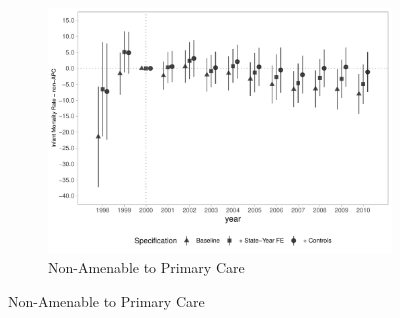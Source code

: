 \begin{figure}[h]
\begin{center}
\begin{subfigure}{0.32\textwidth}
    \end{subfigure}
    \begin{subfigure}{0.32\textwidth}
        \centering
        \caption{\scriptsize Non-Amenable to Primary Care}\label{fig:imr1_c}
        \includegraphics[width=\textwidth]{plots/IMR/tx_mi_nicsap_dist_ec29_baseline_dist_ec29_baseline_full.pdf}
    \end{subfigure}
    
    \end{center}
    
\end{figure}

